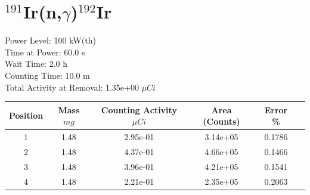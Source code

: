 \newpage

\section*{ $^{191}$Ir(n,$\gamma$)$^{192}$Ir }

Power Level: 100 kW(th) \\
Time at Power: 60.0 s \\
Wait Time:  2.0 h \\
Counting Time: 10.0 m \\
Total Activity at Removal: 1.35e+00 $\mu Ci$

\begin{table}[h]
\centering
\begin{tabular}{ |c|c|c|c|c|c| }
 \hline
 Position & Mass $mg$ & Counting Activity $\mu Ci$ & Area (Counts) & Error \% \\
 \hline 
 1 & 1.48 & 2.95e-01 & 3.14e+05 & 0.1786 \\ 
\hline
 2 & 1.48 & 4.37e-01 & 4.66e+05 & 0.1466 \\ 
\hline
 3 & 1.48 & 3.96e-01 & 4.21e+05 & 0.1541 \\ 
\hline
 4 & 1.48 & 2.21e-01 & 2.35e+05 & 0.2063 \\ 
\hline
\end{tabular}
\end{table}

